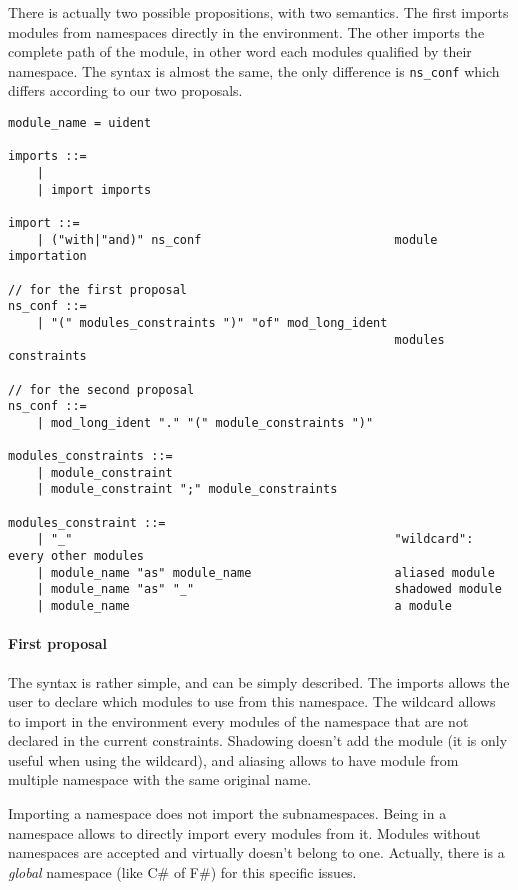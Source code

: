 \documentclass[11pt,a4paper]{article}
\begin{document}
\medskip

There is actually two possible propositions, with two semantics. The first
imports modules from namespaces directly in the environment. The other imports
the complete path of the module, in other word each modules qualified by their
namespace. The syntax is almost the same, the only difference is
\texttt{ns\_conf} which differs according to our two proposals. 


\begin{verbatim}
module_name = uident

imports ::=
    | 
    | import imports 

import ::=
    | ("with|"and)" ns_conf                           module importation    

// for the first proposal
ns_conf ::=
    | "(" modules_constraints ")" "of" mod_long_ident 
                                                      modules constraints

// for the second proposal
ns_conf ::=
    | mod_long_ident "." "(" module_constraints ")"

modules_constraints ::=
    | module_constraint
    | module_constraint ";" module_constraints

modules_constraint ::=
    | "_"                                             "wildcard": every other modules
    | module_name "as" module_name                    aliased module
    | module_name "as" "_"                            shadowed module
    | module_name                                     a module
\end{verbatim}

\paragraph{First proposal}

The syntax is rather simple, and can be simply described. The imports allows the
user to declare which modules to use from this namespace. The wildcard allows to
import in the environment every modules of the namespace that are not declared
in the current constraints. Shadowing doesn't add the module (it is only useful
when using the wildcard), and aliasing allows to have module from multiple
namespace with the same original name.

Importing a namespace does not import the subnamespaces. Being in a namespace
allows to directly import every modules from it. Modules without namespaces are
accepted and virtually doesn't belong to one. Actually, there is a \emph{global}
namespace (like C\# of F\#) for this specific issues.
\end{document}
